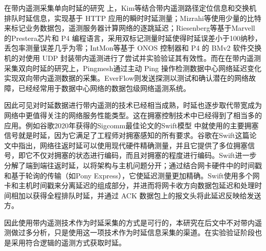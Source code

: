 在带内遥测采集单向时延的研究 \cite{INTSURVEY} 上，Kim等结合带内遥测路径定位信息和交换机排队时延信息，实现基于 \gls*{HTTP} 应用的瞬时时延测量；Mizrahi等使用少量的比特来标记业务数据包，遥测服务器计算网络的逐跳延迟；Riesenberg等基于Marvell的Prestera芯片和 \gls*{P4} 编程语言，采用双标记测量时延使得时延误差小于100纳秒，丢包率测量误差几乎为零；IntMon等基于 \gls*{ONOS} 控制器和 \gls*{P4} 的 \gls*{BMv2} 软件交换机的对使用 \gls*{UDP} 封装带内遥测进行了尝试并实验验证其有效性。而在在带内遥测采集双向时延的研究上，Pingmesh通过主动 \gls*{Ping} 操作检测数据中心网络延迟变化实现双向带内遥测数据的采集。EverFlow则发送探测以测试和确认潜在的网络故障，已经经常用于数据中心网络的数据包级网络遥测系统。

因此可见对时延数据进行带内遥测的技术已经相当成熟，时延也逐步取代带宽成为网络中更值得关注的网络服务性能类型。这在拥塞控制技术中已经得到了相当多的应用。例如谷歌2020年获得的Sigcomm最佳论文的Swift模型 \cite{SWIFT} 中就使用的主要拥塞信号就是时延，因为它满足了工程师对拥塞感知的所有要求。谷歌在Swift这篇论文中指出，网络往返时延可以使用现代硬件精确测量，并且它提供了多位拥塞信号，即它不仅对拥塞的状态进行编码，而且对拥塞的程度进行编码。Swift进一步分解了端到端往返时延，以将架构与主机问题分开；通过结合网卡硬件中的时间戳和基于轮询的传输（如Pony Express），它使延迟测量更加精确。Swift使用多个网卡和主机时间戳来分离延迟的组成部分，并进而将网卡收方向数据包延迟和处理时间相加以获得全程排队时延，并通过 \gls*{ACK} 数据包上的报文头将此延迟反映给发送方。

因此使用带内遥测技术作为时延采集的方式是可行的，本研究在后文中不对带内遥测做过多分析，只是使用这一项技术作为时延信息采集的渠道。在实验验证阶段也是采用符合逻辑的遥测方式获取时延。


\ifx\usechapbib\empty
\nocite{BSTcontrol}
\setcounter{NAT@ctr}{0}


\fi

